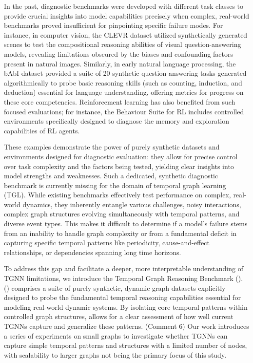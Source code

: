  In the past, diagnostic benchmarks were developed with different task classes to provide crucial insights into model capabilities precisely when complex, real-world benchmarks proved insufficient for pinpointing specific failure modes. For instance, in computer vision, the CLEVR dataset \citep{clevr} utilized synthetically generated scenes to test the compositional reasoning abilities of visual question-answering models, revealing limitations obscured by the biases and confounding factors present in natural images. Similarly, in early natural language processing, the bAbI dataset \citep{babi} provided a suite of 20 synthetic question-answering tasks generated algorithmically to probe basic reasoning skills (such as counting, induction, and deduction) essential for language understanding, offering metrics for progress on these core competencies. Reinforcement learning has also benefited from such focused evaluations; for instance, the Behaviour Suite for RL \citep{bsuite} includes controlled environments specifically designed to diagnose the memory and exploration capabilities of RL agents. 

 These examples demonstrate the power of purely synthetic datasets and environments designed for diagnostic evaluation: they allow for precise control over task complexity and the factors being tested, yielding clear insights into model strengths and weaknesses. Such a dedicated, synthetic diagnostic benchmark is currently missing for the domain of temporal graph learning (TGL). While existing benchmarks effectively test performance on complex, real-world dynamics, they inherently entangle various challenges, noisy interactions, complex graph structures evolving simultaneously with temporal patterns, and diverse event types. This makes it difficult to determine if a model's failure stems from an inability to handle graph complexity or from a fundamental deficit in capturing specific temporal patterns like periodicity, cause-and-effect relationships, or dependencies spanning long time horizons.

 To address this gap and facilitate a deeper, more interpretable understanding of TGNN limitations, we introduce the Temporal Graph Reasoning Benchmark (\benchmarkname). \benchmarkname () comprises a suite of purely synthetic, dynamic graph datasets explicitly designed to probe the fundamental temporal reasoning capabilities essential for modeling real-world dynamic systems. By isolating core temporal patterns within controlled graph structures, \benchmarkname allows for a clear assessment of how well current TGNNs capture and generalize these patterns. (Comment 6) Our work introduces a series of experiments on small graphs to investigate whether TGNNs can capture simple temporal patterns and structures with a limited number of nodes, with scalability to larger graphs not being the primary focus of this study.

